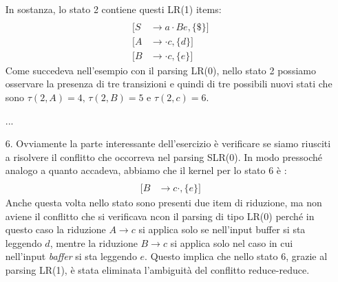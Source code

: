 \documentclass[class=book, crop=false, oneside, 12pt]{standalone}
\begin{document}
\begin{enumerate}
    In sostanza, lo stato 2 contiene questi LR(1) items:
    \begin{align*}
        [S &\to a \cdot Ad, \{\$\}] \\
        [S &\to a \cdot Be, \{\$\}] \\
        [A &\to \cdot c, \{d\}] \\
        [B &\to \cdot c, \{e\}]
    \end{align*}
    Come succedeva nell'esempio con il parsing LR(0), nello stato 2 possiamo osservare la presenza di tre transizioni e quindi di tre possibili nuovi stati che sono \(\tau(2,A)=4 \textrm{, } \tau(2,B)=5 \textrm{ e } \tau(2,c)=6\).
    \item[...]
    \item[6.] Ovviamente la parte interessante dell'esercizio è verificare se siamo riusciti a risolvere il conflitto che occorreva nel parsing SLR(0). In modo pressoché analogo a quanto accadeva, abbiamo che il kernel per lo stato 6 è :
    \begin{align*}
        [A &\to c \cdot, \{d\}] \\
        [B &\to c \cdot, \{e\}]
    \end{align*}
    Anche questa volta nello stato sono presenti due item di riduzione, ma non aviene il conflitto che si verificava ncon il parsing di tipo LR(0) perché in questo caso la riduzione \(A \to c\) si applica solo se nell'input buffer si sta leggendo \(d\), mentre la riduzione \(B \to c\) si applica solo nel caso in cui nell'input \emph{baffer} si sta leggendo \(e\). Questo implica che nello stato 6, grazie al parsing LR(1), è stata eliminata l'ambiguità del conflitto reduce-reduce.
\end{enumerate}
\end{document}
